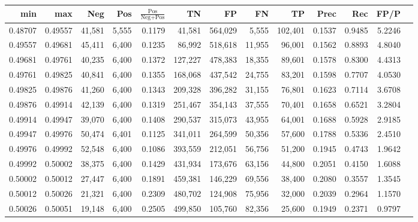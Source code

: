\begin{tabular}{rrrrrrrrrrrrr}
\toprule
    min &     max &    Neg &   Pos & $\frac{\text{Pos}}{\text{Neg}+\text{Pos}}$ &      TN &      FP &      FN &      TP &   Prec &    Rec &   FP/P \\
\midrule
0.48707 & 0.49557 & 41,581 & 5,555 &                                     0.1179 &  41,581 & 564,029 &   5,555 & 102,401 & 0.1537 & 0.9485 & 5.2246 \\
0.49557 & 0.49681 & 45,411 & 6,400 &                                     0.1235 &  86,992 & 518,618 &  11,955 &  96,001 & 0.1562 & 0.8893 & 4.8040 \\
0.49681 & 0.49761 & 40,235 & 6,400 &                                     0.1372 & 127,227 & 478,383 &  18,355 &  89,601 & 0.1578 & 0.8300 & 4.4313 \\
0.49761 & 0.49825 & 40,841 & 6,400 &                                     0.1355 & 168,068 & 437,542 &  24,755 &  83,201 & 0.1598 & 0.7707 & 4.0530 \\
0.49825 & 0.49876 & 41,260 & 6,400 &                                     0.1343 & 209,328 & 396,282 &  31,155 &  76,801 & 0.1623 & 0.7114 & 3.6708 \\
0.49876 & 0.49914 & 42,139 & 6,400 &                                     0.1319 & 251,467 & 354,143 &  37,555 &  70,401 & 0.1658 & 0.6521 & 3.2804 \\
0.49914 & 0.49947 & 39,070 & 6,400 &                                     0.1408 & 290,537 & 315,073 &  43,955 &  64,001 & 0.1688 & 0.5928 & 2.9185 \\
0.49947 & 0.49976 & 50,474 & 6,401 &                                     0.1125 & 341,011 & 264,599 &  50,356 &  57,600 & 0.1788 & 0.5336 & 2.4510 \\
0.49976 & 0.49992 & 52,548 & 6,400 &                                     0.1086 & 393,559 & 212,051 &  56,756 &  51,200 & 0.1945 & 0.4743 & 1.9642 \\
0.49992 & 0.50002 & 38,375 & 6,400 &                                     0.1429 & 431,934 & 173,676 &  63,156 &  44,800 & 0.2051 & 0.4150 & 1.6088 \\
0.50002 & 0.50012 & 27,447 & 6,400 &                                     0.1891 & 459,381 & 146,229 &  69,556 &  38,400 & 0.2080 & 0.3557 & 1.3545 \\
0.50012 & 0.50026 & 21,321 & 6,400 &                                     0.2309 & 480,702 & 124,908 &  75,956 &  32,000 & 0.2039 & 0.2964 & 1.1570 \\
0.50026 & 0.50051 & 19,148 & 6,400 &                                     0.2505 & 499,850 & 105,760 &  82,356 &  25,600 & 0.1949 & 0.2371 & 0.9797 \\

\end{tabular}
